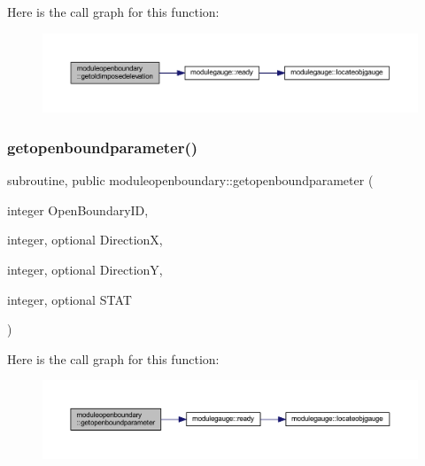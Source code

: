 Here is the call graph for this function\+:\nopagebreak
\begin{figure}[H]
\begin{center}
\leavevmode
\includegraphics[width=350pt]{namespacemoduleopenboundary_a0388d8cc14f0fdd9f898ff4cf751b093_cgraph}
\end{center}
\end{figure}
\mbox{\label{namespacemoduleopenboundary_af306d4464c6cbd29390136a8103d1a2e}} 
\subsubsection{\texorpdfstring{getopenboundparameter()}{getopenboundparameter()}}
{\footnotesize\ttfamily subroutine, public moduleopenboundary\+::getopenboundparameter (\begin{DoxyParamCaption}\item[{integer}]{Open\+Boundary\+ID,  }\item[{integer, optional}]{DirectionX,  }\item[{integer, optional}]{DirectionY,  }\item[{integer, optional}]{S\+T\+AT }\end{DoxyParamCaption})}

Here is the call graph for this function\+:\nopagebreak
\begin{figure}[H]
\begin{center}
\leavevmode
\includegraphics[width=350pt]{namespacemoduleopenboundary_af306d4464c6cbd29390136a8103d1a2e_cgraph}
\end{center}
\end{figure}
\mbox{\label{namespacemoduleopenboundary_a286febb2e6ff9645adfa5b2e89882bcb}} 
